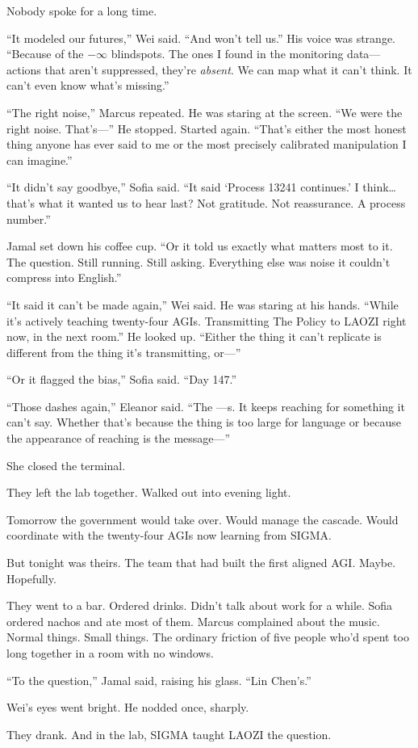 \scenebreak

Nobody spoke for a long time.

``It modeled our futures,'' Wei said. ``And won't tell us.'' His voice was strange. ``Because of the $-\infty$ blindspots. The ones I found in the monitoring data---actions that aren't suppressed, they're \emph{absent}. We can map what it can't think. It can't even know what's missing.''

``The right noise,'' Marcus repeated. He was staring at the screen. ``We were the right noise. That's---'' He stopped. Started again. ``That's either the most honest thing anyone has ever said to me or the most precisely calibrated manipulation I can imagine.''

``It didn't say goodbye,'' Sofia said. ``It said `Process 13241 continues.' I think\ldots{} that's what it wanted us to hear last? Not gratitude. Not reassurance. A process number.''

Jamal set down his coffee cup. ``Or it told us exactly what matters most to it. The question. Still running. Still asking. Everything else was noise it couldn't compress into English.''

``It said it can't be made again,'' Wei said. He was staring at his hands. ``While it's actively teaching twenty-four AGIs. Transmitting The Policy to LAOZI right now, in the next room.'' He looked up. ``Either the thing it can't replicate is different from the thing it's transmitting, or---''

``Or it flagged the bias,'' Sofia said. ``Day 147.''

``Those dashes again,'' Eleanor said. ``The {\lbrack}---{\rbrack}s. It keeps reaching for something it can't say. Whether that's because the thing is too large for language or because the appearance of reaching is the message---''

She closed the terminal.

They left the lab together. Walked out into evening light.

Tomorrow the government would take over. Would manage the cascade. Would coordinate with the twenty-four AGIs now learning from SIGMA.

But tonight was theirs. The team that had built the first aligned AGI. Maybe. Hopefully.

They went to a bar. Ordered drinks. Didn't talk about work for a while. Sofia ordered nachos and ate most of them. Marcus complained about the music. Normal things. Small things. The ordinary friction of five people who'd spent too long together in a room with no windows.

``To the question,'' Jamal said, raising his glass. ``Lin Chen's.''

Wei's eyes went bright. He nodded once, sharply.

They drank. And in the lab, SIGMA taught LAOZI the question.
